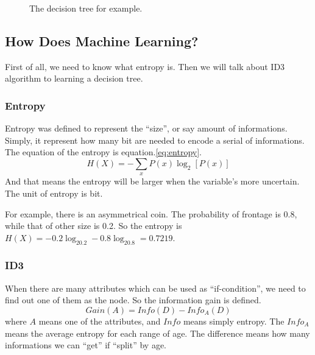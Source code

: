 \documentclass[twoside]{article}
\begin{document}
\begin{figure}
  \centering
  \caption{The decision tree for example.}
  \label{fig:dt:eg}
\end{figure}

\subsection{How Does Machine Learning?}
\label{sec:dt:how}

First of all, we need to know what entropy is.
Then we will talk about ID3 algorithm to learning a decision tree.

\subsubsection{Entropy}
\label{sec:dt:how:entropy}

Entropy was defined to represent the ``size'', or say amount of informations.
Simply, it represent how many bit are needed to encode a serial of informations.
The equation of the entropy is equation.\ref{eq:entropy}.
\begin{equation}
  \label{eq:entropy}
  H(X) = - \sum\limits_x P(x)\log_2\left[P(x)\right]
\end{equation}
And that means the entropy will be larger when the variable's more uncertain.
The unit of entropy is bit.

For example, there is an asymmetrical coin. The probability of frontage is 0.8,
while that of other size is 0.2.
So the entropy is $H(X) = - 0.2\log_20.2 - 0.8\log_20.8 = 0.7219$.

\subsubsection{ID3}
\label{sec:dt:how:id3}

When there are many attributes which can be used as ``if-condition'',
we need to find out one of them as the node. So the information gain is defined.
\begin{equation}
  \label{eq:inforgain}
  Gain(A) = Info(D) - Info_A(D)
\end{equation}
where $A$ means one of the attributes, and $Info$ means simply entropy.
The $Info_A$ means the average entropy for each range of age.
The difference means how many informations we can ``get'' if ``split'' by age.
\end{document}
